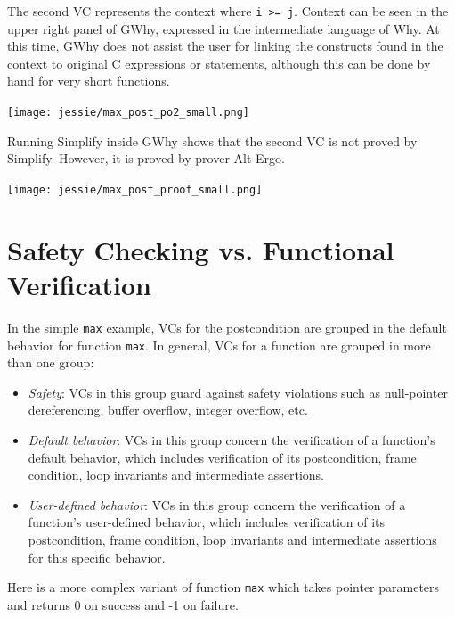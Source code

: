 \documentclass[a4paper,11pt,twoside,openright]{report}
\begin{document}
The second VC represents the context where \verb|i >= j|.  Context can
be seen in the upper right panel of GWhy, expressed in the
intermediate language of Why. At this time, GWhy does not assist
the user for linking the constructs found in the context to 
original C expressions or statements, although this can be done
by hand for very short functions.

\begin{center}
  \texttt{[image: jessie/max\_post\_po2\_small.png]}
\end{center}

Running Simplify inside GWhy shows that the second VC is not proved by
Simplify. However, it is proved by prover Alt-Ergo.

\begin{center}
  \texttt{[image: jessie/max\_post\_proof\_small.png]}
\end{center}

\section{Safety Checking vs. Functional Verification}

In the simple \verb|max| example, VCs for the postcondition are grouped
in the default behavior for function \verb|max|. In general, VCs for a
function are grouped in more than one group:

\begin{itemize}
\item \textit{Safety}: VCs in this group guard against safety violations
  such as null-pointer dereferencing, buffer overflow, integer overflow, etc.
\item \textit{Default behavior}: VCs in this group concern the
  verification of a function's default behavior, which includes
  verification of its postcondition, frame condition, loop invariants
  and intermediate assertions.
\item \textit{User-defined behavior}: VCs in this group concern the
  verification of a function's user-defined behavior, which includes
  verification of its postcondition, frame condition, loop invariants
  and intermediate assertions for this specific behavior.
\end{itemize}

Here is a more complex variant of function \verb|max| which takes
pointer parameters and returns 0 on success and -1 on failure.


\end{document}
